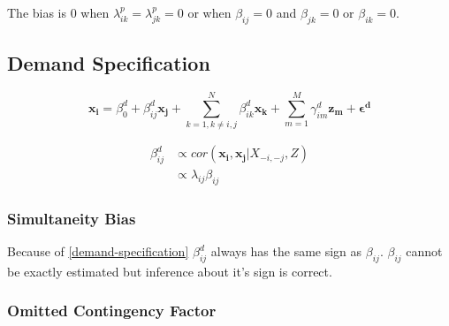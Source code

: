 \documentclass[12pt]{article}
\begin{document}
The bias is 0 when $\lambda^p_{ik} = \lambda^p_{jk} = 0$ or when 
$\beta_{ij} = 0$ and $\beta_{jk} = 0$ or $\beta_{ik} = 0$.


\subsection{Demand Specification}

\begin{equation*} 
    \mathbf{x_i} = \beta_0^d + \beta_{ij}^d \mathbf{x_j} 
	+ \sum_{k = 1, k \neq i,j}^N \beta_{ik}^d \mathbf{x_k} 
    + \sum_{m = 1}^M \gamma_{im}^d \mathbf{z_m}
    + \mathbf{\epsilon^d}
\end{equation*}

\begin{align}
\beta_{ij}^d & \propto cor(\mathbf{x_i}, \mathbf{x_j} | X_{-i, -j}, Z) \nonumber \\
          & \propto \lambda_{ij} \beta_{ij} \label{demand-propto}
\end{align}


\subsubsection{Simultaneity Bias}

Because of \eqref{demand-specification} $\beta_{ij}^d$ always has the same sign as $\beta_{ij}$. $\beta_{ij}$ cannot be exactly estimated but inference about it's sign is correct. 

\subsubsection{Omitted Contingency Factor}
\end{document}
